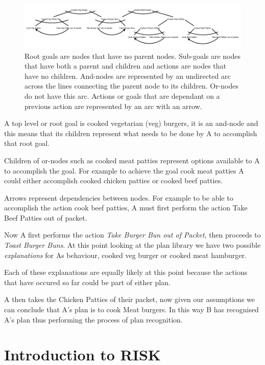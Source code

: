 \documentclass[parskip]{cs4rep}
\begin{document}
\begin{figure}[h]
\centering
\includegraphics{images/example-plan-recognition}
\caption{Root goals are nodes that have no parent nodes. Sub-goals are nodes that have both a parent and children and actions are nodes that have no children. And-nodes are represented by an undirected arc across the lines connecting the parent node to its children. Or-nodes do not have this arc. Actions or goals that are dependant on a previous action are represented by an arc with an arrow.}
\label{fig:example-plan-library}
\end{figure} 

A top level or root goal is cooked vegetarian (veg) burgers, it is an and-node and this means that its children represent what needs to be done by A to accomplish that root goal. 

Children of or-nodes such as cooked meat patties represent options available to A to accomplish the goal. For example to achieve the goal cook meat patties A could either accomplish cooked chicken patties or cooked beef patties.

Arrows represent dependencies between nodes. For example to be able to accomplish the action cook beef patties, A must first perform the action Take Beef Patties out of packet.

Now A first performs the action \textit{Take Burger Bun out of Packet}, then proceeds to \textit{Toast Burger Buns}. At this point looking at the plan library we have two possible \textit{explanations} for As behaviour, cooked veg burger or cooked meat hamburger.

Each of these explanations are equally likely at this point because the actions that have occured so far could be part of either plan.

A then takes the Chicken Patties of their packet, now given our assumptions we can conclude that A's plan is to cook Meat burgers. In this way B has recognised A's plan thus performing the process of plan recognition.

\newpage

\section{Introduction to RISK}
\end{document}
